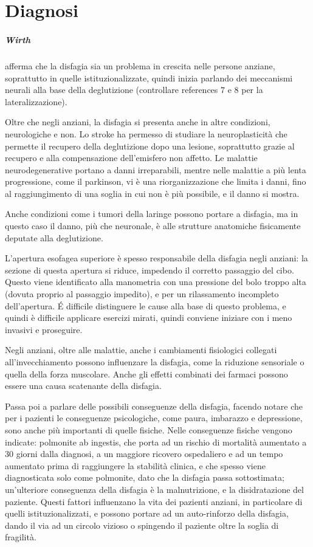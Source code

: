 \chapter{Diagnosi}
\paragraph{Wirth}\label{par:wir} \cite{Wirth2016} afferma che la disfagia sia 
un problema in crescita nelle persone anziane, soprattutto in quelle 
istituzionalizzate, quindi inizia parlando dei meccanismi neurali alla base 
della deglutizione (controllare references 7 e 8 per la lateralizzazione).

Oltre che negli anziani, la disfagia si presenta anche in altre condizioni, 
neurologiche e non.
Lo stroke ha permesso di studiare la neuroplasticità che permette il recupero 
della deglutizione dopo una lesione, soprattutto grazie al recupero e alla 
compensazione dell'emisfero non affetto.
Le malattie neurodegenerative portano a danni irreparabili, mentre nelle 
malattie a più lenta progressione, come il parkinson, vi è una riorganizzazione 
che limita i danni, fino al raggiungimento di una soglia in cui non è più 
possibile, e il danno si mostra.

Anche condizioni come i tumori della laringe possono portare a disfagia, ma in 
questo caso il danno, più che neuronale, è alle strutture anatomiche 
fisicamente deputate alla deglutizione.

L'apertura esofagea superiore è spesso responsabile della disfagia negli 
anziani: la sezione di questa apertura si riduce, impedendo il corretto 
passaggio del cibo.
Questo viene identificato alla manometria con una pressione del bolo troppo 
alta (dovuta proprio al passaggio impedito), e per un rilassamento incompleto 
dell'apertura.
\'E difficile distinguere le cause alla base di questo problema, e quindi è 
difficile applicare esercizi mirati, quindi conviene iniziare con i meno 
invasivi e proseguire.

Negli anziani, oltre alle malattie, anche i cambiamenti fisiologici collegati 
all'invecchiamento possono influenzare la disfagia, come la riduzione 
sensoriale o quella della forza muscolare.
Anche gli effetti combinati dei farmaci possono essere una causa scatenante 
della disfagia.

Passa poi a parlare delle possibili conseguenze della disfagia, facendo notare 
che per i pazienti le conseguenze psicologiche, come paura, imbarazzo e 
depressione, sono anche più importanti di quelle fisiche.
Nelle conseguenze fisiche vengono indicate: polmonite ab ingestis, che porta ad 
un rischio di mortalità aumentato a 30 giorni dalla diagnosi, a un maggiore 
ricovero ospedaliero e ad un tempo aumentato prima di raggiungere la stabilità 
clinica, e che spesso viene diagnosticata solo come polmonite, dato che la 
disfagia passa sottostimata;
un'ulteriore conseguenza della disfagia è la malnutrizione, e la disidratazione 
del paziente.
Questi fattori influenzano la vita dei pazienti anziani, in particolare di 
quelli istituzionalizzati, e possono portare ad un auto-rinforzo della 
disfagia, dando il via ad un circolo vizioso o spingendo il paziente oltre la 
soglia di fragilità.

